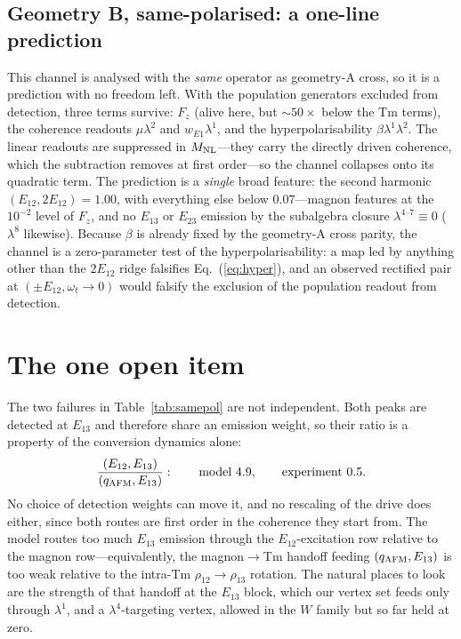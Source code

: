 \documentclass[aps,prb,twocolumn,superscriptaddress,longbibliography]{revtex4-2}
\newcommand{\qafm}{q_{\rm AFM}}
\newcommand{\Mnl}{M_{\rm NL}}
\begin{document}
\subsection{Geometry B, same-polarised: a one-line prediction}

This channel is analysed with the \emph{same} operator as geometry-A
cross, so it is a prediction with no freedom left.  With the population
generators excluded from detection, three terms survive: $F_z$ (alive
here, but $\sim\!50\times$ below the Tm terms), the coherence readouts
$\mu\lambda^2$ and $w_{E1}\lambda^1$, and the hyperpolarisability
$\beta\lambda^1\lambda^2$.  The linear readouts are suppressed in
$\Mnl$---they carry the directly driven coherence, which the
subtraction removes at first order---so the channel collapses onto its
quadratic term.  The prediction is a \emph{single} broad feature: the
second harmonic $(E_{12},2E_{12})=1.00$, with everything else below
$0.07$---magnon features at the $10^{-2}$ level of $F_z$, and no
$E_{13}$ or $E_{23}$ emission by the subalgebra closure
$\lambda^{4\text{--}7}\equiv0$ ($\lambda^8$ likewise).  Because $\beta$
is already fixed by the geometry-A cross parity, the channel is a
zero-parameter test of the hyperpolarisability: a map led by anything
other than the $2E_{12}$ ridge falsifies Eq.~(\ref{eq:hyper}), and an
observed rectified pair at $(\pm E_{12},\omega_t\!\to\!0)$ would
falsify the exclusion of the population readout from detection.

\section{The one open item}
\label{sec:open}

The two failures in Table~\ref{tab:samepol} are not independent.  Both
peaks are detected at $E_{13}$ and therefore share an emission weight, so
their ratio is a property of the conversion dynamics alone:
\begin{equation}
  \frac{(E_{12},E_{13})}{(\qafm,E_{13})}:\qquad
  \text{model }4.9,\qquad\text{experiment }0.5 .
  \label{eq:gap}
\end{equation}
No choice of detection weights can move it, and no rescaling of the drive
does either, since both routes are first order in the coherence they
start from.  The model routes too much $E_{13}$ emission through the
$E_{12}$-excitation row relative to the magnon row---equivalently, the
magnon$\to$Tm handoff feeding $(\qafm,E_{13})$ is too weak relative to
the intra-Tm $\rho_{12}\to\rho_{13}$ rotation.  The natural places to
look are the strength of that handoff at the $E_{13}$ block, which our
vertex set feeds only through $\lambda^1$, and a $\lambda^4$-targeting
vertex, allowed in the $W$ family but so far held at zero.
\end{document}

